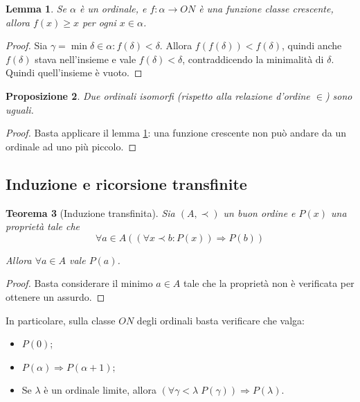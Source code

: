 \documentclass[a4paper,10pt,oneside]{article}
\theoremstyle{plain}
\newtheorem{mytheorem}{Teorema}[section]
\newtheorem{mylemma}[mytheorem]{Lemma}
\newtheorem{myprop}[mytheorem]{Proposizione}
\theoremstyle{definition}
\theoremstyle{remark}
\begin{document}
\begin{mylemma}\label{prop:fcresc}
 Se $\alpha$ è un ordinale, e $f:\alpha \rightarrow ON$ è una funzione classe crescente, allora $f(x)\ge x$ per ogni $x\in \alpha$.
\end{mylemma}
\begin{proof}
 Sia $\gamma = \min{\delta \in \alpha: f(\delta)<\delta}$. Allora $f(f(\delta))<f(\delta)$, quindi anche $f(\delta)$ stava nell'insieme e vale $f(\delta)<\delta$, contraddicendo la minimalità di $\delta$. Quindi quell'insieme è vuoto.
\end{proof}

\begin{myprop}
 Due ordinali isomorfi (rispetto alla relazione d'ordine $\in$) sono uguali.
\end{myprop}
\begin{proof}
 Basta applicare il lemma \ref{prop:fcresc}: una funzione crescente non può andare da un ordinale ad uno più piccolo.
\end{proof}










\subsection{Induzione e ricorsione transfinite}

\begin{mytheorem}[Induzione transfinita]
 
Sia $(A,\prec)$ un buon ordine e $P(x)$ una proprietà tale che \[\forall a\in A ((\forall x\prec b: P(x)) \Rightarrow P(b))\]

Allora $\forall a \in A$ vale $P(a)$.
\end{mytheorem}
\begin{proof}
 Basta considerare il minimo $a\in A$ tale che la proprietà non è verificata per ottenere un assurdo.
\end{proof}
In particolare, sulla classe $ON$ degli ordinali basta verificare che valga:
\begin{itemize}
 \item $P(0)$;
 \item $P(\alpha)\Rightarrow P(\alpha+1);$
 \item Se $\lambda$ è un ordinale limite, allora $(\forall \gamma<\lambda\; P(\gamma))\Rightarrow P(\lambda)$.
\end{itemize}
\end{document}

